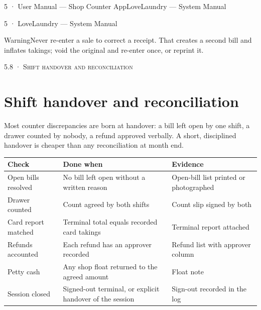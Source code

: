 \documentclass[11pt,a4paper,oneside]{book}
\begin{document}
5 · User Manual — Shop Counter AppLoveLaundry — System Manual

5 · LoveLaundry — System Manual

\begin{notebox}WarningNever re-enter a sale to correct a receipt. That creates a second bill and inflates takings; void the original and re-enter once, or reprint it.\end{notebox}
\textsc{\small\color{crimson}5.8 · Shift handover and reconciliation}\par\medskip
\section*{Shift handover and reconciliation}
Most counter discrepancies are born at handover: a bill left open by one shift, a drawer counted by nobody, a refund approved verbally. A short, disciplined handover is cheaper than any reconciliation at month end.

\begin{center}\small
\begin{tabularx}{\linewidth}{|X|X|X|}
\hline
\rowcolor{lightgrey}
\textbf{Check} & \textbf{Done when} & \textbf{Evidence} \\ \hline
Open bills resolved & No bill left open without a written reason & Open-bill list printed or photographed \\ \hline
Drawer counted & Count agreed by both shifts & Count slip signed by both \\ \hline
Card report matched & Terminal total equals recorded card takings & Terminal report attached \\ \hline
Refunds accounted & Each refund has an approver recorded & Refund list with approver column \\ \hline
Petty cash & Any shop float returned to the agreed amount & Float note \\ \hline
Session closed & Signed-out terminal, or explicit handover of the session & Sign-out recorded in the log \\ \hline
\end{tabularx}
\end{center}
\end{document}
